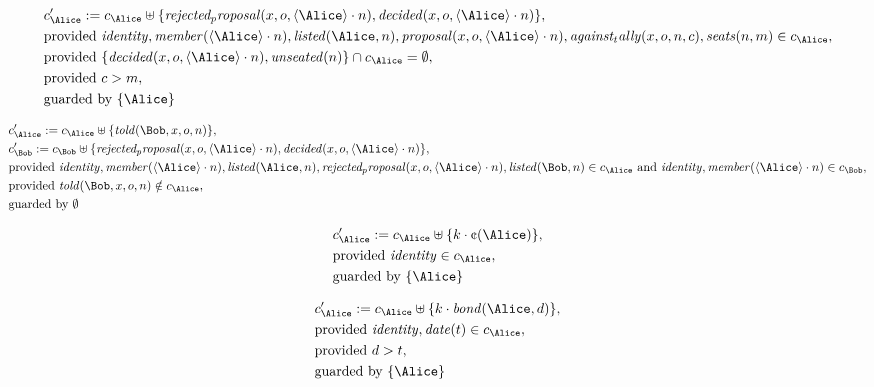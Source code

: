\begin{align*}
&
c'_
{
\Alice
}
 := 
c_
{
\Alice
}
 \uplus 
\{
\mathit{
rejected_proposal
}
(
x
,
o
,
\langle
\Alice
\rangle
\cdot
n
)
,
\mathit{
decided
}
(
x
,
o
,
\langle
\Alice
\rangle
\cdot
n
)
\}
,\\
&
\text{provided } 
\mathit{
identity
}
,
\mathit{
member
}
(
\langle
\Alice
\rangle
\cdot
n
)
,
\mathit{
listed
}
(
\Alice
,
n
)
,
\mathit{
proposal
}
(
x
,
o
,
\langle
\Alice
\rangle
\cdot
n
)
,
\mathit{
against_tally
}
(
x
,
o
,
n
,
c
)
,
\mathit{
seats
}
(
n
,
m
)
 \in c_
{
\Alice
}
,\\
&
\text{provided } 
\{
\mathit{
decided
}
(
x
,
o
,
\langle
\Alice
\rangle
\cdot
n
)
,
\mathit{
unseated
}
(
n
)
\}
 \cap c_
{
\Alice
}
 = \emptyset
,\\
&
\text{provided } 
c
>
m
,\\
&
\text{guarded by } \{
\Alice
\}
\end{align*}

\begin{align*}
&
c'_
{
\Alice
}
 := 
c_
{
\Alice
}
 \uplus 
\{
\mathit{
told
}
(
\Bob
,
x
,
o
,
n
)
\}
,\\
&
c'_
{
\Bob
}
 := 
c_
{
\Bob
}
 \uplus 
\{
\mathit{
rejected_proposal
}
(
x
,
o
,
\langle
\Alice
\rangle
\cdot
n
)
,
\mathit{
decided
}
(
x
,
o
,
\langle
\Alice
\rangle
\cdot
n
)
\}
,\\
&
\text{provided } 
\mathit{
identity
}
,
\mathit{
member
}
(
\langle
\Alice
\rangle
\cdot
n
)
,
\mathit{
listed
}
(
\Alice
,
n
)
,
\mathit{
rejected_proposal
}
(
x
,
o
,
\langle
\Alice
\rangle
\cdot
n
)
,
\mathit{
listed
}
(
\Bob
,
n
)
 \in c_
{
\Alice
}
 \text{ and } 
\mathit{
identity
}
,
\mathit{
member
}
(
\langle
\Alice
\rangle
\cdot
n
)
 \in c_
{
\Bob
}
,\\
&
\text{provided } 
\mathit{
told
}
(
\Bob
,
x
,
o
,
n
)
 \notin c_
{
\Alice
}
,\\
&
\text{guarded by } \emptyset
\end{align*}

\begin{align*}
&
c'_
{
\Alice
}
 := 
c_
{
\Alice
}
 \uplus 
\{
k
\cdot
\text{\textcent}
(
\Alice
)
\}
,\\
&
\text{provided } 
\mathit{
identity
}
 \in c_
{
\Alice
}
,\\
&
\text{guarded by } \{
\Alice
\}
\end{align*}

\begin{align*}
&
c'_
{
\Alice
}
 := 
c_
{
\Alice
}
 \uplus 
\{
k
\cdot
\mathit{
bond
}
(
\Alice
,
d
)
\}
,\\
&
\text{provided } 
\mathit{
identity
}
,
\mathit{
date
}
(
t
)
 \in c_
{
\Alice
}
,\\
&
\text{provided } 
d
>
t
,\\
&
\text{guarded by } \{
\Alice
\}
\end{align*}
